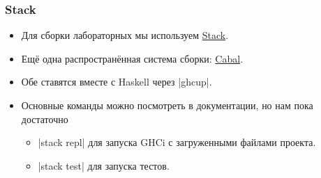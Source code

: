 \documentclass[10pt]{beamer}
\begin{document}
\begin{frame}[fragile]
  \frametitle{Stack}
  \begin{itemize}
    \item Для сборки лабораторных мы используем \href{https://docs.haskellstack.org/en/stable/#quick-start-guide}{Stack}.
    \item Ещё одна распространённая система сборки: \href{https://cabal.readthedocs.io/}{Cabal}.
    \item Обе ставятся вместе с Haskell через \ghcinline|ghcup|.
    \item Основные команды можно посмотреть в документации, но нам пока достаточно
          \begin{itemize}
            \item \ghcinline|stack repl| для запуска GHCi с загруженными файлами проекта.
            \item \ghcinline|stack test| для запуска тестов.
          \end{itemize}
  \end{itemize}
\end{frame}
\end{document}
